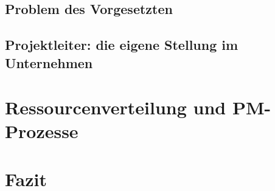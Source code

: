 \documentclass[12pt]{scrartcl}
\begin{document}
\subsection{Problem des Vorgesetzten}

\subsection{Projektleiter: die eigene Stellung im Unternehmen}


\pagebreak
\section{Ressourcenverteilung und PM-Prozesse}

\pagebreak

\section{Fazit}

\pagebreak
{} %

\appendix
\end{document}
